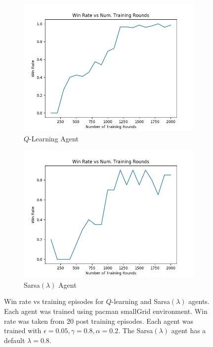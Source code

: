 \documentclass[10pt,conference]{IEEEtran}
\begin{document}
	\begin{figure}[h]
		\centering
		\begin{subfigure}{0.5\textwidth}
			\includegraphics[width=\textwidth]{./images/qlearning_winrate}
			\caption{\(Q\)-Learning Agent}
		\end{subfigure}%
		\begin{subfigure}{0.5\textwidth}
			\includegraphics[width=\textwidth]{./images/sarsa_winrate}
			\caption{Sarsa\((\lambda)\) Agent}
		\end{subfigure}
		\caption{Win rate vs training episodes for \(Q\)-learning and
		Sarsa\((\lambda)\) agents.  Each agent was trained using 
		pacman smallGrid environment.  Win rate was taken from 
		20 post training episodes. Each agent was trained with 
		\(\epsilon = 0.05, \gamma = 0.8, \alpha = 0.2\).  The 
		Sarsa\((\lambda)\) agent has a default \(\lambda = 0.8\).}
		\label{winrate}
	\end{figure}
\end{document}

